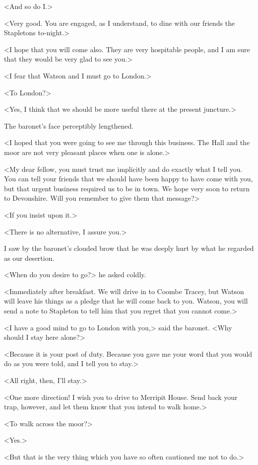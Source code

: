 <And so do I\@.>

<Very good. You are engaged, as I understand, to dine with our friends the Stapletons to-night.>

<I hope that you will come also. They are very hospitable people, and I am sure that they would be very glad to see you.>

<I fear that Watson and I must go to London.>

<To London?>

<Yes, I think that we should be more useful there at the present juncture.>

The baronet's face perceptibly lengthened.

<I hoped that you were going to see me through this business. The Hall and the moor are not very pleasant places when one is alone.>

<My dear fellow, you must trust me implicitly and do exactly what I tell you. You can tell your friends that we should have been happy to have come with you, but that urgent business required us to be in town. We hope very soon to return to Devonshire. Will you remember to give them that message?>

<If you insist upon it.>

<There is no alternative, I assure you.>

I saw by the baronet's clouded brow that he was deeply hurt by what he regarded as our desertion.

<When do you desire to go?> he asked coldly.

<Immediately after breakfast. We will drive in to Coombe Tracey, but Watson will leave his things as a pledge that he will come back to you. Watson, you will send a note to Stapleton to tell him that you regret that you cannot come.>

<I have a good mind to go to London with you,> said the baronet. <Why should I stay here alone?>

<Because it is your post of duty. Because you gave me your word that you would do as you were told, and I tell you to stay.>

<All right, then, I'll stay.>

<One more direction! I wish you to drive to Merripit House. Send back your trap, however, and let them know that you intend to walk home.>

<To walk across the moor?>

<Yes.>

<But that is the very thing which you have so often cautioned me not to do.>

